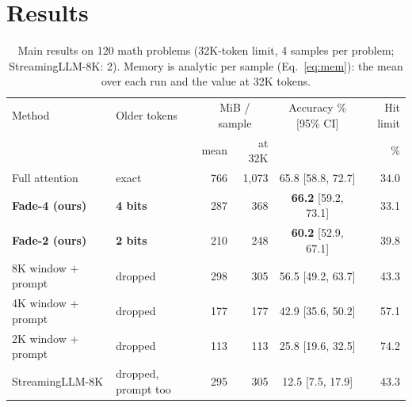 \documentclass{article}
\begin{document}
\vspace{-0.6em}
\section{Results}
\label{sec:results}
\vspace{-0.4em}

\begin{table}[t]
\caption{Main results on 120 math problems (32K-token limit, 4 samples per problem; StreamingLLM-8K: 2). Memory is analytic per sample (Eq.~\ref{eq:mem}): the mean over each run and the value at 32K tokens.}
\label{tab:main}
\centering
\small
\setlength{\tabcolsep}{4pt}
\begin{tabular}{@{}llrrcr@{}}
\toprule
Method & Older tokens & \multicolumn{2}{c}{MiB / sample} & Accuracy \% [95\% CI] & Hit limit \\
 & & mean & at 32K & & \% \\
\midrule
Full attention & exact & 766 & 1,073 & 65.8 [58.8, 72.7] & 34.0 \\
\textbf{Fade-4 (ours)} & \textbf{4 bits} & 287 & 368 & \textbf{66.2} [59.2, 73.1] & 33.1 \\
\textbf{Fade-2 (ours)} & \textbf{2 bits} & 210 & 248 & \textbf{60.2} [52.9, 67.1] & 39.8 \\
8K window + prompt & dropped & 298 & 305 & 56.5 [49.2, 63.7] & 43.3 \\
4K window + prompt & dropped & 177 & 177 & 42.9 [35.6, 50.2] & 57.1 \\
2K window + prompt & dropped & 113 & 113 & 25.8 [19.6, 32.5] & 74.2 \\
StreamingLLM-8K & dropped, prompt too & 295 & 305 & 12.5 [7.5, 17.9] & 43.3 \\
\bottomrule
\end{tabular}
\vspace{-0.4em}
\end{table}
\end{document}
